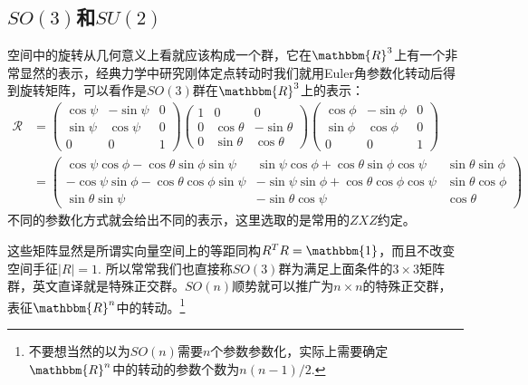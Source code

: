 \subsection{$SO(3)$和$SU(2)$}
空间中的旋转从几何意义上看就应该构成一个群，它在$\mathbbm{R}^3$上有一个非常显然的表示，经典力学中研究刚体定点转动时我们就用Euler角参数化转动后得到旋转矩阵，可以看作是$SO(3)$群在$\mathbbm{R}^3$上的表示：
\begin{equation}
	\label{eq:D.4.27}
	\begin{aligned}
		\mathcal{R}&=\left( {\begin{array}{*{20}{c}}
				{\cos \psi }&{ - \sin \psi }&0 \\ 
				{\sin \psi }&{\cos \psi }&0 \\ 
				0&0&1 
		\end{array}} \right)\left( {\begin{array}{*{20}{c}}
				1&0&0 \\ 
				0&{\cos \theta }&{ - \sin \theta } \\ 
				0&{\sin \theta }&{\cos \theta } 
		\end{array}} \right)\left( {\begin{array}{*{20}{c}}
				{\cos \phi }&{ - \sin \phi }&0 \\ 
				{\sin \phi }&{\cos \phi }&0 \\ 
				0&0&1 
		\end{array}} \right)\\
	&=\left( {\begin{array}{*{20}{c}}
			{\cos \psi \cos \phi  - \cos \theta \sin \phi \sin \psi }&{\sin \psi \cos \phi  + \cos \theta \sin \phi \cos \psi }&{\sin \theta \sin \phi } \\ 
			{ - \cos \psi \sin \phi  - \cos \theta \cos \phi \sin \psi }&{ - \sin \psi \sin \phi  + \cos \theta \cos \phi \cos \psi }&{\sin \theta \cos \phi } \\ 
			{\sin \theta \sin \psi }&{ - \sin \theta \cos \psi }&{\cos \theta } 
	\end{array}} \right)
	\end{aligned}
\end{equation}
不同的参数化方式就会给出不同的表示，这里选取的是常用的$ZXZ$约定。

这些矩阵显然是所谓实向量空间上的等距同构$R^TR=\mathbbm{1}$，而且不改变空间手征$|R|=1$. 所以常常我们也直接称$SO(3)$群为满足上面条件的$3\times 3$矩阵群，英文直译就是特殊正交群。$SO(n)$顺势就可以推广为$n\times n$的特殊正交群，表征$\mathbbm{R}^n$中的转动。\footnote{不要想当然的以为$SO(n)$需要$n$个参数参数化，实际上需要确定$\mathbbm{R}^n$中的转动的参数个数为$n(n-1)/2$.}

